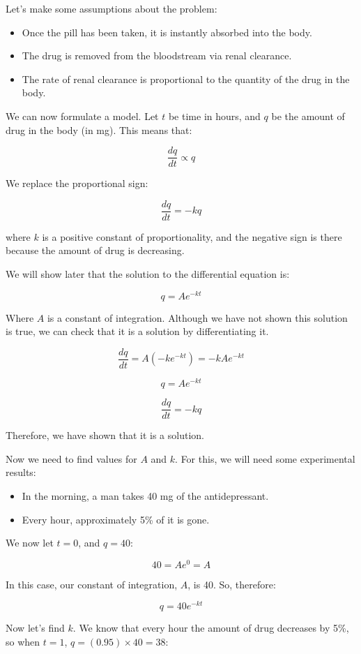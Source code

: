 Let's make some assumptions about the problem:

\begin{itemize}
    \item Once the pill has been taken, it is instantly absorbed into the body.
    \item The drug is removed from the bloodstream via renal clearance.
    \item The rate of renal clearance is proportional to the quantity of the drug in the body.
\end{itemize}

We can now formulate a model. Let $t$ be time in hours, and $q$ be the amount of drug in the body (in mg). This means that:

$$\frac{dq}{dt} \propto q$$

We replace the proportional sign:

$$\frac{dq}{dt} = -kq$$ 

where $k$ is a positive constant of proportionality, and the negative sign is there because the amount of drug is decreasing.

We will show later that the solution to the differential equation is:

$$q = Ae^{-kt}$$

Where $A$ is a constant of integration. Although we have not shown this solution is true, we can check that it is a solution by differentiating it.

$$\frac{dq}{dt} = A(-ke^{-kt}) = -kAe^{-kt}$$

$$q = Ae^{-kt}$$

$$\frac{dq}{dt} = -kq$$

Therefore, we have shown that it is a solution.

Now we need to find values for $A$ and $k$. For this, we will need some experimental results:

\begin{itemize}
    \item In the morning, a man takes 40 mg of the antidepressant.
    \item Every hour, approximately 5\% of it is gone.
\end{itemize}

We now let $t=0$, and $q=40$:

$$40 = Ae^{0} = A$$

In this case, our constant of integration, $A$, is 40. So, therefore:

$$q = 40e^{-kt}$$

Now let's find $k$. We know that every hour the amount of drug decreases by 5\%, so when $t=1$, $q=(0.95) \times 40 = 38$:

